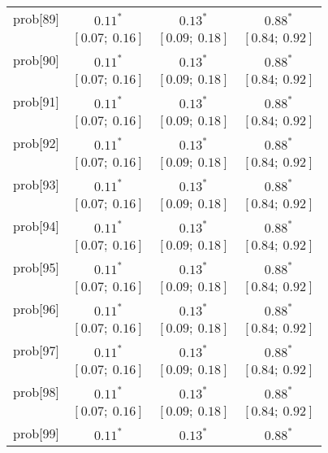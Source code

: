 \begin{table}
\begin{center}
\begin{tabular}{l c c c }
prob[89]  & $0.11^{*}$              & $0.13^{*}$              & $0.88^{*}$            \\
          & $[0.07;\ 0.16]$         & $[0.09;\ 0.18]$         & $[0.84;\ 0.92]$       \\
prob[90]  & $0.11^{*}$              & $0.13^{*}$              & $0.88^{*}$            \\
          & $[0.07;\ 0.16]$         & $[0.09;\ 0.18]$         & $[0.84;\ 0.92]$       \\
prob[91]  & $0.11^{*}$              & $0.13^{*}$              & $0.88^{*}$            \\
          & $[0.07;\ 0.16]$         & $[0.09;\ 0.18]$         & $[0.84;\ 0.92]$       \\
prob[92]  & $0.11^{*}$              & $0.13^{*}$              & $0.88^{*}$            \\
          & $[0.07;\ 0.16]$         & $[0.09;\ 0.18]$         & $[0.84;\ 0.92]$       \\
prob[93]  & $0.11^{*}$              & $0.13^{*}$              & $0.88^{*}$            \\
          & $[0.07;\ 0.16]$         & $[0.09;\ 0.18]$         & $[0.84;\ 0.92]$       \\
prob[94]  & $0.11^{*}$              & $0.13^{*}$              & $0.88^{*}$            \\
          & $[0.07;\ 0.16]$         & $[0.09;\ 0.18]$         & $[0.84;\ 0.92]$       \\
prob[95]  & $0.11^{*}$              & $0.13^{*}$              & $0.88^{*}$            \\
          & $[0.07;\ 0.16]$         & $[0.09;\ 0.18]$         & $[0.84;\ 0.92]$       \\
prob[96]  & $0.11^{*}$              & $0.13^{*}$              & $0.88^{*}$            \\
          & $[0.07;\ 0.16]$         & $[0.09;\ 0.18]$         & $[0.84;\ 0.92]$       \\
prob[97]  & $0.11^{*}$              & $0.13^{*}$              & $0.88^{*}$            \\
          & $[0.07;\ 0.16]$         & $[0.09;\ 0.18]$         & $[0.84;\ 0.92]$       \\
prob[98]  & $0.11^{*}$              & $0.13^{*}$              & $0.88^{*}$            \\
          & $[0.07;\ 0.16]$         & $[0.09;\ 0.18]$         & $[0.84;\ 0.92]$       \\
prob[99]  & $0.11^{*}$              & $0.13^{*}$              & $0.88^{*}$            \\

\end{tabular}
\end{center}
\end{table}
